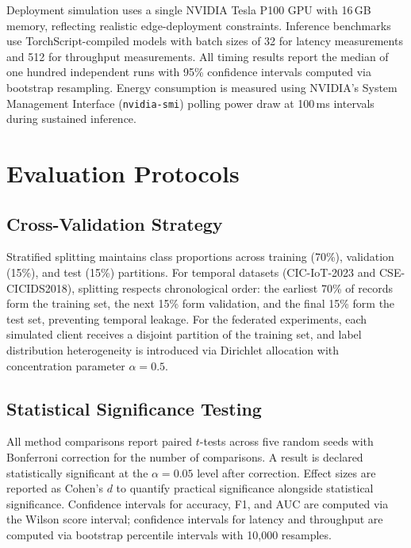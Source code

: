 Deployment simulation uses a single NVIDIA Tesla P100 GPU with 16\,GB memory, reflecting realistic edge-deployment constraints. Inference benchmarks use TorchScript-compiled models with batch sizes of 32 for latency measurements and 512 for throughput measurements. All timing results report the median of one hundred independent runs with 95\% confidence intervals computed via bootstrap resampling. Energy consumption is measured using NVIDIA's System Management Interface (\texttt{nvidia-smi}) polling power draw at 100\,ms intervals during sustained inference.


\section{Evaluation Protocols}
\label{app:eval_protocols}

\subsection{Cross-Validation Strategy}
\label{app:cv}

Stratified splitting maintains class proportions across training (70\%), validation (15\%), and test (15\%) partitions. For temporal datasets (CIC-IoT-2023 and CSE-CICIDS2018), splitting respects chronological order: the earliest 70\% of records form the training set, the next 15\% form validation, and the final 15\% form the test set, preventing temporal leakage. For the federated experiments, each simulated client receives a disjoint partition of the training set, and label distribution heterogeneity is introduced via Dirichlet allocation with concentration parameter $\alpha=0.5$.


\subsection{Statistical Significance Testing}
\label{app:significance}

All method comparisons report paired $t$-tests across five random seeds with Bonferroni correction for the number of comparisons. A result is declared statistically significant at the $\alpha=0.05$ level after correction. Effect sizes are reported as Cohen's $d$ to quantify practical significance alongside statistical significance. Confidence intervals for accuracy, F1, and AUC are computed via the Wilson score interval; confidence intervals for latency and throughput are computed via bootstrap percentile intervals with 10{,}000 resamples.


